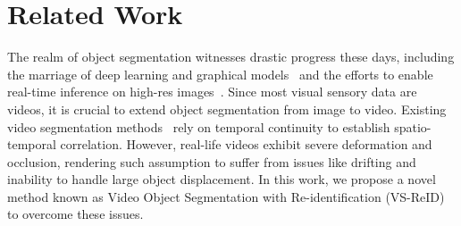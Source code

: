 \section{Related Work}

The realm of object segmentation witnesses drastic progress these days, including the marriage of deep learning and graphical models~\cite{zheng2015conditional, liu2015semantic} and the efforts to enable real-time inference on high-res images~\cite{li2017not, zhao2017icnet}.
Since most visual sensory data are videos, it is crucial to extend object segmentation from image to video.
Existing video segmentation methods~\cite{liu2016deep, Perazzi2017} rely on temporal continuity to establish spatio-temporal correlation.
However, real-life videos exhibit severe deformation and occlusion, rendering such assumption to suffer from issues like drifting and inability to handle large object  displacement.
In this work, we propose a novel method known as Video Object Segmentation with Re-identification (VS-ReID) to overcome these issues.



